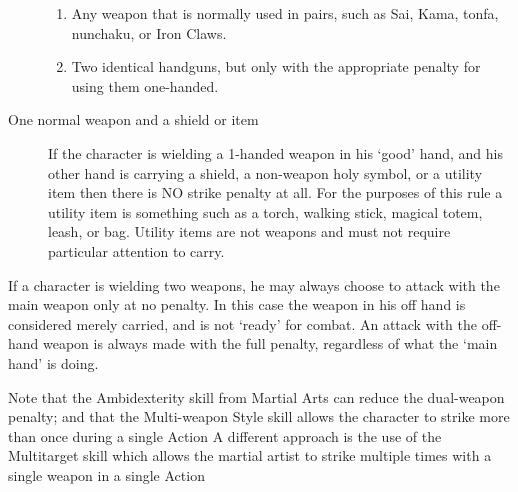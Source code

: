 \documentclass[twoside]{book}
\begin{document}
\begin{description}
{\begin{enumerate}
                    
  \item 
                      
    {  
     Any weapon that is normally used in pairs,
                       such as Sai, Kama, tonfa, nunchaku, or Iron Claws.
                       
    }
  
                    
  \item 
                      
    {  
     Two identical handguns, but only with the
                       appropriate penalty for using them one-handed.
                       
    }
  
                    
\end{enumerate}
    
                
    }
  
  \item[ One normal weapon and a shield or item
                   ] 
    {  
      If the character is wielding a 1-handed weapon
                   in his `good' hand, and his other hand is
                   carrying a shield, a non-weapon holy symbol, or a
                   utility item then there is NO strike penalty at all.
                   For the purposes of this rule a utility item is
                   something such as a torch, walking stick, magical
                   totem, leash, or bag. Utility items are not weapons
                   and must not require particular attention to carry.
                   
    }
  
\end{description}
  
    {  
     If a character is wielding two weapons, he may
               always choose to attack with the main weapon only at no
               penalty. In this case the weapon in his off hand is
               considered merely carried, and is not `ready'
               for combat. An attack with the off-hand weapon is always
               made with the full penalty, regardless of what the
               `main hand' is doing. 
    }
  
    {  
     Note that the Ambidexterity skill from Martial Arts
               can reduce the dual-weapon penalty; and that the
               Multi-weapon Style skill allows the character to strike
               more than once during a single Action A different approach
               is the use of the Multitarget skill which allows the
               martial artist to strike multiple times with a single
               weapon in a single Action 
    }
  
\end{document}
